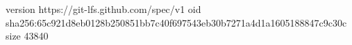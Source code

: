 version https://git-lfs.github.com/spec/v1
oid sha256:65c921d8eb0128b250851bb7c40f697543eb30b7271a4d1a1605188847c9c30c
size 43840

